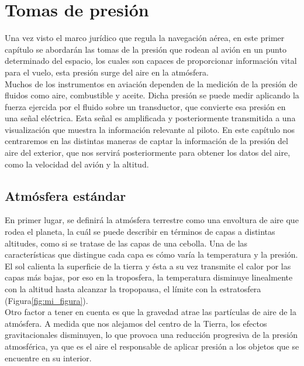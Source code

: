 \setcounter{page}{1}
\chapter{Tomas de presión}
\chapterspaceabove{6.75cm} %
\chapterspacebelow{7.25cm} %

Una vez visto el marco jurídico que regula la navegación aérea, en este primer capítulo se abordarán las tomas de la presión que rodean al avión en un punto determinado del espacio, los cuales son capaces de proporcionar información vital para el vuelo, esta presión surge del aire en la atmósfera.\\

Muchos de los instrumentos en aviación dependen de la medición de la presión de fluidos como aire, combustible y aceite. Dicha presión se puede medir aplicando la fuerza ejercida por el fluido sobre un transductor, que convierte esa presión en una señal eléctrica. Esta señal es amplificada y posteriormente transmitida a una visualización que muestra la información relevante al piloto. En este capítulo nos centraremos en las distintas maneras de captar la información de la presión del aire del exterior, que nos servirá posteriormente para obtener los datos del aire, como la velocidad del avión y la altitud.\\

\section{Atmósfera estándar}
En primer lugar, se definirá la atmósfera terrestre como una envoltura de aire que rodea el planeta, la cuál se puede describir en términos de capas a distintas altitudes, como si se tratase de las capas de una cebolla. Una de las características que distingue cada capa es cómo varía la temperatura y la presión.\\

El sol calienta la superficie de la tierra y ésta a su vez transmite el calor por las capas más bajas, por eso en la troposfera, la temperatura disminuye linealmente con la altitud hasta alcanzar la tropopausa, el límite con la estratosfera (Figura\ref{fig:mi_figura}).\\

Otro factor a tener en cuenta es que la gravedad atrae las partículas de aire de la atmósfera. A medida que nos alejamos del centro de la Tierra, los efectos gravitacionales disminuyen, lo que provoca una reducción progresiva de la presión atmosférica, ya que es el aire el responsable de aplicar presión a los objetos que se encuentre en su interior.\\

